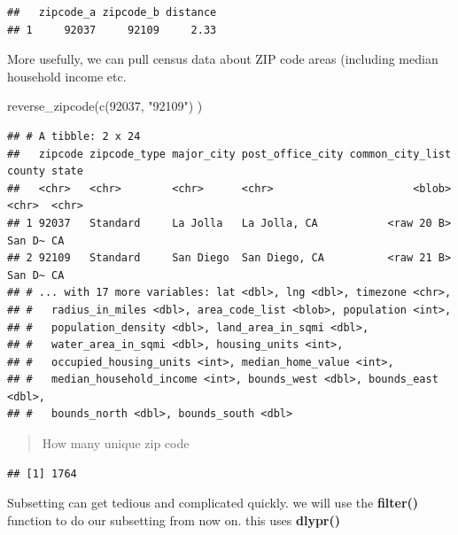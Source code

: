 \documentclass[
]{article}
\newenvironment{Shaded}{\begin{snugshade}}{\end{snugshade}}
\newcommand{\FunctionTok}[1]{\textcolor[rgb]{0.00,0.00,0.00}{#1}}
\newcommand{\NormalTok}[1]{#1}
\newcommand{\SpecialCharTok}[1]{\textcolor[rgb]{0.00,0.00,0.00}{#1}}
\newcommand{\StringTok}[1]{\textcolor[rgb]{0.31,0.60,0.02}{#1}}
\begin{document}
\begin{verbatim}
##   zipcode_a zipcode_b distance
## 1     92037     92109     2.33
\end{verbatim}

More usefully, we can pull census data about ZIP code areas (including
median household income etc.

\begin{Shaded}
\begin{Highlighting}[]
\FunctionTok{reverse\_zipcode}\NormalTok{(}\FunctionTok{c}\NormalTok{(}\StringTok{\textquotesingle{}92037\textquotesingle{}}\NormalTok{, }\StringTok{"92109"}\NormalTok{) )}
\end{Highlighting}
\end{Shaded}

\begin{verbatim}
## # A tibble: 2 x 24
##   zipcode zipcode_type major_city post_office_city common_city_list county state
##   <chr>   <chr>        <chr>      <chr>                      <blob> <chr>  <chr>
## 1 92037   Standard     La Jolla   La Jolla, CA           <raw 20 B> San D~ CA   
## 2 92109   Standard     San Diego  San Diego, CA          <raw 21 B> San D~ CA   
## # ... with 17 more variables: lat <dbl>, lng <dbl>, timezone <chr>,
## #   radius_in_miles <dbl>, area_code_list <blob>, population <int>,
## #   population_density <dbl>, land_area_in_sqmi <dbl>,
## #   water_area_in_sqmi <dbl>, housing_units <int>,
## #   occupied_housing_units <int>, median_home_value <int>,
## #   median_household_income <int>, bounds_west <dbl>, bounds_east <dbl>,
## #   bounds_north <dbl>, bounds_south <dbl>
\end{verbatim}

\begin{quote}
How many unique zip code
\end{quote}

\begin{Shaded}
\end{Shaded}

\begin{verbatim}
## [1] 1764
\end{verbatim}

Subsetting can get tedious and complicated quickly. we will use the
\textbf{filter()} function to do our subsetting from now on. this uses
\textbf{dlypr()}
\end{document}
